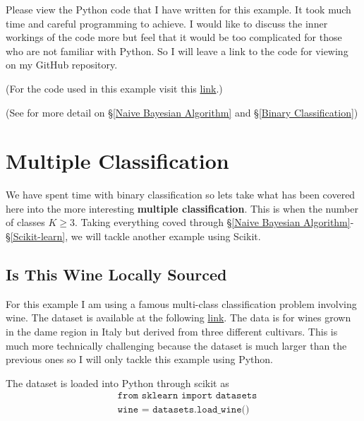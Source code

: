 \documentclass[12pt,twoside]{report}   %
\newcommand{\bb}{\textbf}
\begin{document}
Please view the Python code that I have written for this example. It took much time and careful programming to achieve. I would like to discuss the inner workings of the code more but feel that it would be too complicated for those who are not familiar with Python. So I will leave a link to the code for viewing on my GitHub repository.

(For the code used in this example visit this \href{https://github.com/iMikeT/MathProject2/tree/master/Python%20Code/Text%20Classification}{link}.)

(See \cite{4} for more detail on \S\ref{Naive Bayesian Algorithm} and \S\ref{Binary Classification})

\section{Multiple Classification}\label{Multiple Classification}
\vspace{-0.4in}
\underline{\hspace{6.2in}}
\vspace{-0.1in}

We have spent time with binary classification so lets take what has been covered here into the more interesting \bb{multiple classification}. This is when the number of classes $K\geq3$. Taking everything coved through \S\ref{Naive Bayesian Algorithm}-\S\ref{Scikit-learn}, we will tackle another example using Scikit.

\subsection{Is This Wine Locally Sourced}\label{wine example}
\vspace{-0.35in}
\underline{\hspace{6.2in}}
\vspace{-0.1in}

For this example I am using a famous multi-class classification problem involving wine. The dataset is available at the following \href{https://archive.ics.uci.edu/ml/datasets/wine}{link}. The data is for wines grown in the dame region in Italy but derived from three different cultivars. This is much more technically challenging because the dataset is much larger than the previous ones so I will only tackle this example using Python.

The dataset is loaded into Python through scikit as
\begin{align*}
&\texttt{from sklearn import datasets}\\
&\texttt{wine = datasets.load\_wine()}
\end{align*}
\end{document}
